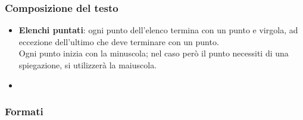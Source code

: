 		\subsubsection{Composizione del testo}
		\begin{itemize}
			\item \textbf{Elenchi puntati}: ogni punto dell'elenco termina con un punto e virgola, ad eccezione dell'ultimo che deve terminare con un punto. \\
			Ogni punto inizia con la minuscola; nel caso però il punto necessiti di una spiegazione, si utilizzerà la maiuscola. %
			\item \textbf{}
		\end{itemize}
		\subsubsection{Formati}

